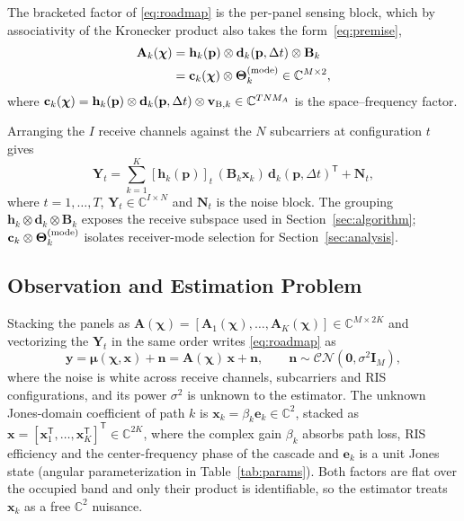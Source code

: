 \documentclass[letterpaper,journal]{IEEEtran}
\newcommand{\C}{\mathbb{C}}
\newcommand{\bp}{\mathbf{p}}
\newcommand{\bx}{\mathbf{x}}
\newcommand{\by}{\mathbf{y}}
\newcommand{\bc}{\mathbf{c}}
\newcommand{\bd}{\mathbf{d}}
\newcommand{\be}{\mathbf{e}}
\newcommand{\bh}{\mathbf{h}}
\newcommand{\bv}{\mathbf{v}}
\newcommand{\bn}{\mathbf{n}}
\newcommand{\bA}{\mathbf{A}}
\newcommand{\bBm}{\mathbf{B}}
\newcommand{\bI}{\mathbf{I}}
\newcommand{\bY}{\mathbf{Y}}
\newcommand{\bN}{\mathbf{N}}
\newcommand{\bTheta}{\boldsymbol{\Theta}}
\newcommand{\bmu}{\boldsymbol{\mu}}
\newcommand{\bchi}{\boldsymbol{\chi}}
\begin{document}
The bracketed factor of \eqref{eq:roadmap} is the per-panel sensing block,
which by associativity of the Kronecker product also takes the
form~\eqref{eq:premise},
\begin{align}
	\bA_k(\bchi)
	&= \bh_k(\bp)\otimes\bd_k(\bp,\Delta t)\otimes\bBm_k\nonumber\\
	&= \bc_k(\bchi)\otimes\bTheta_k^{({\rm mode})}\in\C^{M\times2},
	\label{eq:Ak}
\end{align}
where $\bc_k(\bchi)=\bh_k(\bp)\otimes\bd_k(\bp,\Delta t)\otimes
\bv_{{\rm B},k}\in\C^{TNM_A}$ is the space--frequency factor.

Arranging the $I$ receive channels against the $N$ subcarriers at
configuration $t$ gives
\begin{equation}
	\bY_t=\sum_{k=1}^{K}[\bh_k(\bp)]_t\,(\bBm_k\bx_k)\,
	\bd_k(\bp,\Delta t)^{\mathsf T}+\bN_t,
	\label{eq:obsmat}
\end{equation}
where $t=1,\ldots,T$, $\bY_t\in\C^{I\times N}$ and $\bN_t$ is the noise
block. The grouping $\bh_k\otimes\bd_k\otimes\bBm_k$ exposes the receive
subspace used in Section~\ref{sec:algorithm};
$\bc_k\otimes\bTheta_k^{({\rm mode})}$ isolates receiver-mode selection for
Section~\ref{sec:analysis}.

\subsection{Observation and Estimation Problem}
\label{subsec:obsmodel}

Stacking the panels as
$\bA(\bchi)=[\bA_1(\bchi),\ldots,\bA_K(\bchi)]\in\C^{M\times 2K}$ and
vectorizing the $\bY_t$ in the same order writes \eqref{eq:roadmap} as
\begin{equation}
	\by = \bmu(\bchi,\bx) + \bn = \bA(\bchi)\,\bx + \bn,
	\qquad
	\bn\sim\mathcal{CN}(\mathbf 0,\sigma^2\bI_M),
	\label{eq:obs}
\end{equation}
where the noise is white across receive channels, subcarriers and RIS
configurations, and its power $\sigma^2$ is unknown to the estimator. The
unknown Jones-domain coefficient of path $k$
is $\bx_k=\beta_k\be_k\in\C^2$, stacked as
$\bx=[\bx_1^{\mathsf T},\ldots,\bx_K^{\mathsf T}]^{\mathsf T}\in\C^{2K}$,
where the complex gain $\beta_k$ absorbs path loss, RIS efficiency and the
center-frequency phase of the cascade and $\be_k$ is a unit Jones state
(angular parameterization in Table~\ref{tab:params}). Both factors are flat over the
occupied band and only their product is identifiable, so the estimator
treats $\bx_k$ as a free $\C^2$ nuisance.
\end{document}
